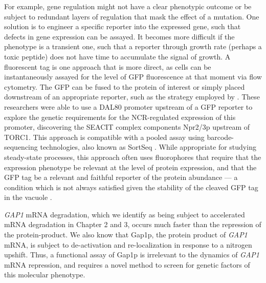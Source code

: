 For example, gene regulation might not have a
clear phenotypic outcome or be subject to redundant layers of
regulation that mask the effect of a mutation. One solution is to
engineer a specific reporter into the expressed gene, such that
defects in gene expression can be assayed. It becomes more difficult
if the phenotype is a transient one, such that a reporter through
growth rate (perhaps a toxic peptide) does not have time to accumulate
the signal of growth. A fluorescent tag is one approach that is more
direct, as cells can be instantaneously assayed for the
level of GFP fluorescence at that moment via flow cytometry. The GFP
can be fused to the protein of interest or simply placed downstream of
an appropriate reporter, such as the strategy employed by 
\cite{neklesa2009genome}. 
These researchers were able to use a DAL80 promoter upstream of a GFP
reporter to explore the genetic requirements for the NCR-regulated
expression of this promoter, discovering the SEACIT complex components
Npr2/3p upstream of TORC1. 
This approach is compatible with a pooled assay using
barcode-sequencing technologies, also known as SortSeq
\parencite{kinney2010using,oikonomou2014systematic,peterman2016sort,de2017deciphering}.
While appropriate for studying steady-state processes, this approach
often uses fluorophores that require that the
expression phenotype be relevant at the level of protein expression,
and that the GFP tag be a relevant and faithful reporter of
the protein abundance --- a condition which is not always satisfied 
given the stability of the cleaved GFP tag in the vacuole
\parencite{conibear2002studying}.

\textit{GAP1} mRNA degradation, which we identify as
being subject to accelerated mRNA degradation in Chapter 2 and 3,
occurs much faster than the repression of the protein-product. We also
know that Gap1p, the protein product of \textit{GAP1} mRNA, is subject to
de-activation and re-localization in response to a nitrogen upshift.
Thus, a functional assay of Gap1p is irrelevant to the dynamics of
\textit{GAP1} mRNA repression, and requires a novel method to screen for
genetic factors of this molecular phenotype.  

